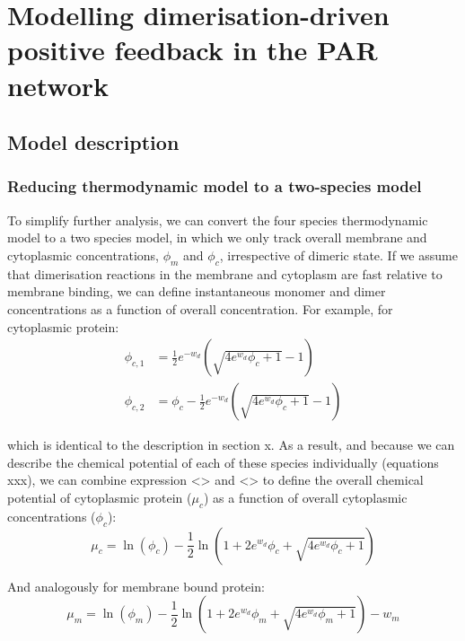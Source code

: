 \documentclass[12pt]{"article"}
\begin{document}
\clearpage
\section{Modelling dimerisation-driven positive feedback in the PAR network}

\subsection{Model description}

\subsubsection{Reducing thermodynamic model to a two-species model} 

To simplify further analysis, we can convert the four species thermodynamic model to a two species model, in which we only track overall membrane and cytoplasmic concentrations, $\phi_m$ and $\phi_c$, irrespective of dimeric state. If we assume that dimerisation reactions in the membrane and cytoplasm are fast relative to membrane binding, we can define instantaneous monomer and dimer concentrations as a function of overall concentration. For example, for cytoplasmic protein:
\begin{align}
\phi_{c,1} &= \frac{1}{2}e^{-w_d}\left(\sqrt{4e^{w_d}\phi_c + 1} - 1\right)\\
\phi_{c,2} &= \phi_c - \frac{1}{2}e^{-w_d}\left(\sqrt{4e^{w_d}\phi_c + 1} - 1\right)
\end{align}

which is identical to the description in section x. As a result, and because we can describe the chemical potential of each of these species individually (equations xxx), we can combine expression <> and <> to define the overall chemical potential of cytoplasmic protein ($\mu_c$) as a function of overall cytoplasmic concentrations ($\phi_c$):
\begin{equation}
\mu_c = \ln(\phi_c) - \frac{1}{2}\ln\left(1 + 2e^{w_d}\phi_c + \sqrt{4e^{w_d}\phi_c + 1}\right)
\end{equation}

And analogously for membrane bound protein: 
\begin{equation}
\mu_m = \ln(\phi_m) - \frac{1}{2}\ln\left(1 + 2e^{w_d}\phi_m + \sqrt{4e^{w_d}\phi_m + 1}\right) - w_m
\end{equation}
\end{document}
